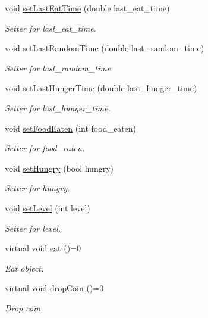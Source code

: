 \begin{DoxyCompactItemize}
void \mbox{\hyperlink{class_fish_ad53bd870836825ab0cc4b4d987325772}{set\+Last\+Eat\+Time}} (double last\+\_\+eat\+\_\+time)
\begin{DoxyCompactList}\small\item\em Setter for last\+\_\+eat\+\_\+time. \end{DoxyCompactList}\item 
void \mbox{\hyperlink{class_fish_a883d6bd47ac65d319269eee4c46cf461}{set\+Last\+Random\+Time}} (double last\+\_\+random\+\_\+time)
\begin{DoxyCompactList}\small\item\em Setter for last\+\_\+random\+\_\+time. \end{DoxyCompactList}\item 
void \mbox{\hyperlink{class_fish_aca013c7fba46ca20ab12909945e535d4}{set\+Last\+Hunger\+Time}} (double last\+\_\+hunger\+\_\+time)
\begin{DoxyCompactList}\small\item\em Setter for last\+\_\+hunger\+\_\+time. \end{DoxyCompactList}\item 
void \mbox{\hyperlink{class_fish_a37379e4c783602bd7c3d475a67167c11}{set\+Food\+Eaten}} (int food\+\_\+eaten)
\begin{DoxyCompactList}\small\item\em Setter for food\+\_\+eaten. \end{DoxyCompactList}\item 
void \mbox{\hyperlink{class_fish_a8b24063bf538f0502cf38ce5859aec8e}{set\+Hungry}} (bool hungry)
\begin{DoxyCompactList}\small\item\em Setter for hungry. \end{DoxyCompactList}\item 
void \mbox{\hyperlink{class_fish_aee737597ff02a50486c6e2096ccc220d}{set\+Level}} (int level)
\begin{DoxyCompactList}\small\item\em Setter for level. \end{DoxyCompactList}\item 
virtual void \mbox{\hyperlink{class_fish_af209980bd39b8de9b4bb38b7ad4edd04}{eat}} ()=0
\begin{DoxyCompactList}\small\item\em Eat object. \end{DoxyCompactList}\item 
virtual void \mbox{\hyperlink{class_fish_a899c7712639756297b9205e8bbcc2cf6}{drop\+Coin}} ()=0
\begin{DoxyCompactList}\small\item\em Drop coin. \end{DoxyCompactList}\end{DoxyCompactItemize}
